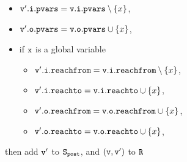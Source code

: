 \begin{itemize}
\begin{enumerate}
\begin{itemize} 
\item $\mathtt{v}'.\mathtt{i}.\mathtt{pvars} = \mathtt{v}.\mathtt{i}.\mathtt{pvars} \setminus \left\{x\right\}$,
\item $\mathtt{v}'.\mathtt{o}.\mathtt{pvars} = \mathtt{v}.\mathtt{o}.\mathtt{pvars} \cup \left\{x\right\}$,
\item if $\tt x$ is a global variable
\begin{itemize}
\item $\mathtt{v}'.\mathtt{i}.\mathtt{reachfrom} = \mathtt{v}.\mathtt{i}.\mathtt{reachfrom} \setminus \left\{x\right\}$,
\item $\mathtt{v}'.\mathtt{i}.\mathtt{reachto} = \mathtt{v}.\mathtt{i}.\mathtt{reachto} \cup \left\{x\right\}$,
 \item $\mathtt{v}'.\mathtt{o}.\mathtt{reachfrom} = \mathtt{v}.\mathtt{o}.\mathtt{reachfrom} \cup \left\{x\right\}$,
 \item $\mathtt{v}'.\mathtt{o}.\mathtt{reachto} = \mathtt{v}.\mathtt{o}.\mathtt{reachto} \cup \left\{x\right\}$,
\end{itemize}
\end{itemize}
then add $\tt v'$ to $\tt S_{post}$, and $\tt (v,v')$ to $\tt R$


\end{enumerate}
\end{itemize}
